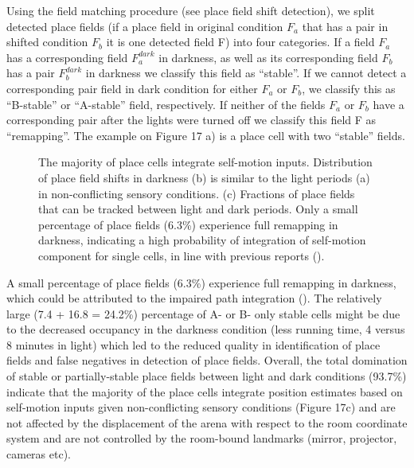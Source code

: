Using the field matching procedure (see place field shift detection), we split detected place fields (if a place field in original condition $F_a$ that has a pair in shifted condition $F_b$ it is one detected field F) into four categories. If a field $F_a$ has a corresponding field $F_a^{dark}$ in darkness, as well as its corresponding field $F_b$ has a pair $F_b^{dark}$ in darkness we classify this field as “stable”. If we cannot detect a corresponding pair field in dark condition for either $F_a$ or $F_b$, we classify this as “B-stable” or “A-stable” field, respectively. If neither of the fields $F_a$ or $F_b$ have a corresponding pair after the lights were turned off we classify this field F as “remapping”. The example on Figure 17 a) is a place cell with two “stable” fields.

\begin{figure}
\captionsetup{format=plain}
\caption[Widespread integration of self-motion inputs]{
The majority of place cells integrate self-motion inputs. Distribution of place field shifts in darkness (b) is similar to the light periods (a) in non-conflicting sensory conditions. (c) Fractions of place fields that can be tracked between light and dark periods. Only a small percentage of place fields (6.3\%) experience full remapping in darkness, indicating a high probability of integration of self-motion component for single cells, in line with previous reports (\cite{Allen6245}).
}
\label{fig:F17_integration_of_sm_inputs}
\end{figure}

A small percentage of place fields (6.3\%) experience full remapping in darkness, which could be attributed to the impaired path integration (\cite{Allen6245}). The relatively large (7.4 + 16.8 = 24.2\%) percentage of A- or B- only stable cells might be due to the decreased occupancy in the darkness condition (less running time, 4 versus 8 minutes in light) which led to the reduced quality in identification of place fields and false negatives in detection of place fields. Overall, the total domination of stable or partially-stable place fields between light and dark conditions (93.7\%) indicate that the majority of the place cells integrate position estimates based on self-motion inputs given non-conflicting sensory conditions (Figure 17c) and are not affected by the displacement of the arena with respect to the room coordinate system and are not controlled by the room-bound landmarks (mirror, projector, cameras etc).


